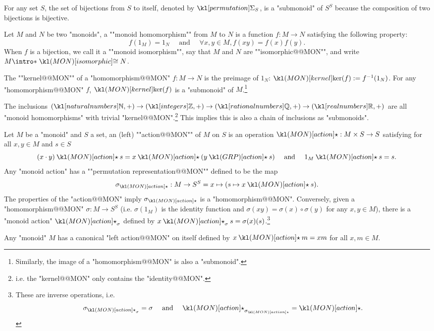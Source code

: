 \documentclass[main.tex]{subfiles}
\begin{document}
\begin{exmp}
	For any set $S$, the set of bijections from $S$ to itself, denoted by $\Perm_S$, is a "submonoid" of $S^S$ because the composition of two bijections is bijective.
\end{exmp}
\begin{defn}[Homomorphism]
    \AP Let $M$ and $N$ be two "monoids", a ""monoid homomorphism"" from $M$ to $N$ is a function $f: M \rightarrow N$ satisfying the following property:
    \[f(1_M) = 1_N \quad \text{ and } \quad \forall x,y \in M, f(xy) = f(x)f(y).\]
    \AP When $f$ is a bijection, we call it a ""monoid isomorphism"", say that $M$ and $N$ are ""isomorphic@@MON"", and write $M \intro*\isoMON N$.
\end{defn}
\begin{defn}[Kernel]
    \AP The ""kernel@@MON"" of a "homomorphism@@MON" $f: M \rightarrow N$ is the preimage of $1_N$: $\kermon(f) := f^{-1}(1_N)$. For any "homomorphism@@MON" $f$, $\kermon(f)$ is a "submonoid" of $M$.\footnote{Similarly, the image of a "homomorphism@@MON" is also a "submonoid".}
\end{defn}
\begin{exmp}
    The inclusions $(\N,+) \rightarrow (\Z,+) \rightarrow (\Q,+) \rightarrow (\R,+)$ are all "monoid homomorphisms" with trivial "kernel@@MON".\footnote{i.e. the "kernel@@MON" only contains the "identity@@MON".} This implies this is also a chain of inclusions as "submonoids".
\end{exmp}
\begin{defn}
    Let $M$ be a "monoid" and $S$ a set, \AP an (left) ""action@@MON"" of $M$ on $S$ is an operation $\actmon : M \times S \rightarrow S$ satisfying for all $x,y \in M$ and $s \in S$
    \[(x\cdot y)\actmon s = x \actmon (y\act s) \quad \text{ and } \quad 1_M \actmon s = s.\]
    \AP Any "monoid action" has a ""permutation representation@@MON"" defined to be the map \[\sigma_{\actmon}: M \rightarrow S^S = x \mapsto (s \mapsto x \actmon s).\]
    The properties of the "action@@MON" imply $\sigma_{\actmon}$ is a "homomorphism@@MON". Conversely, given a "homomorphism@@MON" $\sigma: M \rightarrow S^S$ (i.e. $\sigma(1_M)$ is the identity function and $\sigma(xy)= \sigma(x) \circ \sigma(y)$ for any $x,y \in M$), there is a "monoid action" $\actmon_\sigma$ defined by $x \actmon_\sigma s = \sigma(x)(s)$.\footnote{These are inverse operations, i.e.\[\sigma_{\actmon_{\sigma}} = \sigma \quad \text{ and } \quad \actmon_{\sigma_{\actmon}} = \actmon.\]}
\end{defn}
\begin{exmp}
    Any "monoid" $M$ has a canonical "left action@@MON" on itself defined by $x \actmon m = xm$ for all $x,m\in M$.
\end{exmp}
\end{document}
